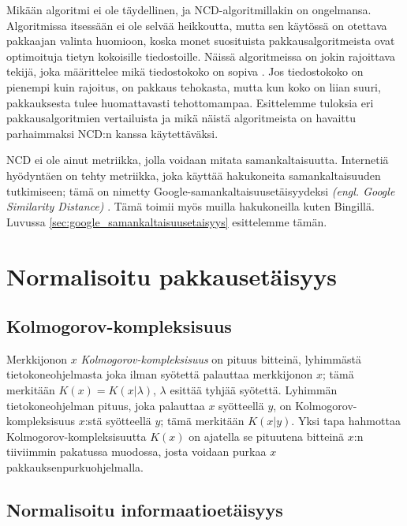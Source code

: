 \documentclass[12pt,finnish,final]{tktltiki2}
\theoremstyle{definition}
\theoremstyle{remark}
\newcommand{\engl}[1]{\emph{(engl. #1)}}
\newcommand{\kolmogorov}{Kolmogorov-kompleksisuus}
\begin{document}
  Mikään algoritmi ei ole täydellinen, ja NCD-algoritmillakin on ongelmansa.
  Algoritmissa itsessään ei ole selvää heikkoutta, mutta sen käytössä on otettava pakkaajan valinta huomioon, koska monet suosituista pakkausalgoritmeista ovat optimoituja tietyn kokoisille tiedostoille.
  Näissä algoritmeissa on jokin rajoittava tekijä, joka määrittelee mikä tiedostokoko on sopiva \cite{cebrian2005common}.
  Jos tiedostokoko on pienempi kuin rajoitus, on pakkaus tehokasta, mutta kun koko on liian suuri, pakkauksesta tulee huomattavasti tehottomampaa.
  Esittelemme tuloksia eri pakkausalgoritmien vertailuista ja mikä näistä algoritmeista on havaittu parhaimmaksi NCD:n kanssa käytettäväksi.


\label{par:intro-5}
  NCD ei ole ainut metriikka, jolla voidaan mitata samankaltaisuutta.
  Internetiä hyödyntäen on tehty metriikka, joka käyttää hakukoneita samankaltaisuuden tutkimiseen; tämä on nimetty Google-samankaltaisuusetäisyydeksi \engl{Google Similarity Distance} \cite{cilibrasi2007google}.
  Tämä toimii myös muilla hakukoneilla kuten Bingillä. Luvussa \ref{sec:google_samankaltaisuusetaisyys} esittelemme tämän.


\section{Normalisoitu pakkausetäisyys} %
\label{sec:normalisoitu_pakkausetaisyys}
  \subsection{\kolmogorov} %
\label{sub:kolmogorov_kompleksisuus}

  Merkkijonon $x$ \emph{\kolmogorov} on pituus bitteinä, lyhimmästä tietokoneohjelmasta joka ilman syötettä palauttaa merkkijonon $x$; tämä merkitään $K(x)=K(x|\lambda)$, $\lambda$ esittää tyhjää syötettä.
  Lyhimmän tietokoneohjelman pituus, joka palauttaa $x$ syötteellä $y$, on \kolmogorov{} $x$:stä syötteellä $y$; tämä merkitään $K(x|y)$.
  Yksi tapa hahmottaa Kolmogorov-kompleksisuutta $K(x)$ on ajatella se pituutena bitteinä $x$:n tiiviimmin pakatussa muodossa, josta voidaan purkaa $x$ pakkauksenpurkuohjelmalla.

\subsection{Normalisoitu informaatioetäisyys} %
\label{sub:normalisoitu_informaatioetaisyys}
\end{document}
